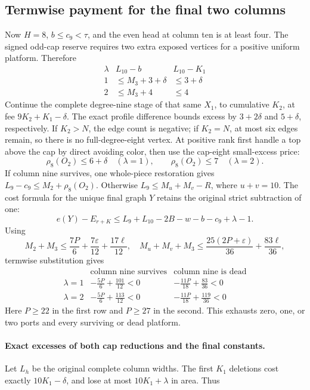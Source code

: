 \documentclass[11pt,a4paper]{article}
\theoremstyle{definition}
\begin{document}
\subsection{Termwise payment for the final two columns}
Now $H=8$, $b\le c_9<\tau$, and the even head at column ten is at least four. The signed odd-cap reserve requires two extra exposed vertices for a positive uniform platform. Therefore
\[
 \begin{array}{c|c|c}
 \lambda&L_{10}-b&L_{10}-K_1\\ \hline
 1&\le M_3+3+\delta&\le3+\delta\\
 2&\le M_3+4&\le4
 \end{array}
\]
Continue the complete degree-nine stage of that same $X_1$, to cumulative $K_2$, at fee $9K_2+K_1-\delta$. The exact profile difference bounds excess by $3+2\delta$ and $5+\delta$, respectively. If $K_2>N$, the edge count is negative; if $K_2=N$, at most six edges remain, so there is no full-degree-eight vertex. At positive rank first handle a top above the cap by direct avoiding color, then use the cap-eight small-excess price:
\[
 \rho_8(O_2)\le6+\delta\quad(\lambda=1),\qquad
 \rho_8(O_2)\le7\quad(\lambda=2).
\]
If column nine survives, one whole-piece restoration gives $L_9-c_9\le M_2+\rho_8(O_2)$. Otherwise $L_9\le M_u+M_v-R$, where $u+v=10$.
The cost formula for the unique final graph $Y$ retains the original strict subtraction of one:
\[
 e(Y)-E_{r+K}\le L_9+L_{10}-2B-w-b-c_9+\lambda-1.
\]
Using
\[
 M_2+M_3\le\frac{7P}{6}+\frac{7\varepsilon}{12}+\frac{17\ell}{12},
\quad
 M_u+M_v+M_3\le\frac{25(2P+\varepsilon)}{36}+\frac{83\ell}{36},
\]
termwise substitution gives
\[
\renewcommand{\arraystretch}{1.6}
\begin{array}{c|c|c}
 &\text{column nine survives}&\text{column nine is dead}\\ \hline
\lambda=1&-\frac{5P}{6}+\frac{101}{12}<0&
-\frac{11P}{18}+\frac{83}{36}<0\\
\lambda=2&-\frac{5P}{6}+\frac{113}{12}<0&
-\frac{11P}{18}+\frac{119}{36}<0
\end{array}
\]
Here $P\ge22$ in the first row and $P\ge27$ in the second. This exhausts zero, one, or two ports and every surviving or dead platform.
\paragraph{Exact excesses of both cap reductions and the final constants.}
Let $L_h$ be the original complete column widths. The first $K_1$ deletions cost exactly $10K_1-\delta$, and lose at most $10K_1+\lambda$ in area. Thus
\end{document}
